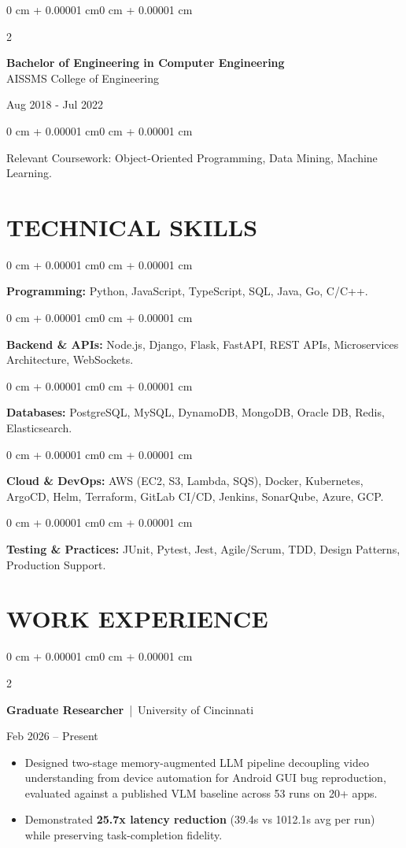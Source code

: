 \documentclass[10pt, letterpaper]{article}
\newenvironment{highlights}{
    \begin{itemize}[
        topsep=0.10 cm,
        parsep=0.06 cm,
        partopsep=0pt,
        itemsep=0.06 cm,
        leftmargin=12pt
    ]
}{
    \end{itemize}
}
\newenvironment{onecolentry}{
    \begin{adjustwidth}{0 cm + 0.00001 cm}{0 cm + 0.00001 cm}
}{
    \end{adjustwidth}
}
\newenvironment{twocolentry}[2][]{
    \onecolentry
    \def\secondColumn{#2}
    \setcolumnwidth{\fill, 4.5 cm}
    \begin{paracol}{2}
}{
    \switchcolumn \raggedleft \secondColumn
    \end{paracol}
    \endonecolentry
}
\begin{document}
\begin{twocolentry}{
    Aug 2018 - Jul 2022
}
    \textbf{Bachelor of Engineering in Computer Engineering} \\
    AISSMS College of Engineering
\end{twocolentry}
\begin{onecolentry}
Relevant Coursework: Object-Oriented Programming, Data Mining, Machine Learning.
\end{onecolentry}
\section{TECHNICAL SKILLS}
\begin{onecolentry}
\textbf{Programming:} Python, JavaScript, TypeScript, SQL, Java, Go, C/C++.
\end{onecolentry}
\vspace{0.06 cm}
\begin{onecolentry}
\textbf{Backend \& APIs:} Node.js, Django, Flask, FastAPI, REST APIs, Microservices Architecture, WebSockets.
\end{onecolentry}
\vspace{0.06 cm}
\begin{onecolentry}
\textbf{Databases:} PostgreSQL, MySQL, DynamoDB, MongoDB, Oracle DB, Redis, Elasticsearch.
\end{onecolentry}
\vspace{0.06 cm}
\begin{onecolentry}
\textbf{Cloud \& DevOps:} AWS (EC2, S3, Lambda, SQS), Docker, Kubernetes, ArgoCD, Helm, Terraform, GitLab CI/CD, Jenkins, SonarQube, Azure, GCP.
\end{onecolentry}
\vspace{0.06 cm}
\begin{onecolentry}
\textbf{Testing \& Practices:} JUnit, Pytest, Jest, Agile/Scrum, TDD, Design Patterns, Production Support.
\end{onecolentry}

\section{WORK EXPERIENCE}
\begin{twocolentry}{Feb 2026 -- Present}
\textbf{Graduate Researcher} \,|\, University of Cincinnati
\end{twocolentry}
\begin{highlights}
  \item Designed two-stage memory-augmented LLM pipeline decoupling video understanding from device automation for Android GUI bug reproduction, evaluated against a published VLM baseline across 53 runs on 20+ apps.
  \item Demonstrated \textbf{25.7x latency reduction} (39.4s vs 1012.1s avg per run) while preserving task-completion fidelity.
\end{highlights}
\end{document}
